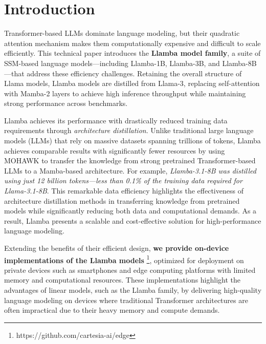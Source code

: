 \section{Introduction}

Transformer-based LLMs dominate language modeling, but their quadratic attention mechanism makes them computationally expensive and difficult to scale efficiently.
This technical paper introduces the \textbf{Llamba model family}, a suite of SSM-based language models—including Llamba-1B, Llamba-3B, and Llamba-8B—that address these efficiency challenges.
Retaining the overall structure of Llama models, Llamba models are distilled from Llama-3, replacing self-attention with Mamba-2 layers to achieve high inference throughput while maintaining strong performance across benchmarks.

Llamba achieves its performance with drastically reduced training data requirements through \emph{architecture distillation}.
Unlike traditional large language models (LLMs) that rely on massive datasets spanning trillions of tokens, Llamba achieves comparable results with significantly fewer resources by using MOHAWK \citep{mohawk} to transfer the knowledge from strong pretrained Transformer-based LLMs 
to a Mamba-based architecture.
For example, \textit{Llamba-3.1-8B was distilled using just 12 billion tokens—less than 0.1\% of the training data required for Llama-3.1-8B}.
This remarkable data efficiency highlights the effectiveness of architecture distillation methods
in transferring knowledge from pretrained models while significantly reducing both data and computational demands. As a result, Llamba presents a scalable and cost-effective solution for high-performance language modeling.

Extending the benefits of their efficient design, \textbf{we provide on-device implementations of the Llamba models}
\footnote{https://github.com/cartesia-ai/edge}, optimized for deployment on private devices such as smartphones and edge computing platforms with limited memory and computational resources. 
These implementations highlight the advantages of linear models, such as the Llamba family, by delivering high-quality language modeling on devices where traditional Transformer architectures are often impractical due to their heavy memory and compute demands.


